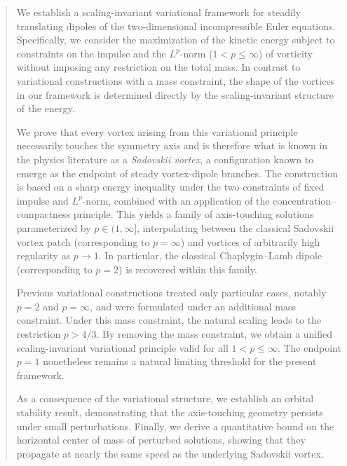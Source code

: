 \documentclass[10pt,a4paper]{amsart}
\theoremstyle{definition}
\theoremstyle{definition}
\numberwithin{equation}{section}
\newcommand{\0}{\emptyset}
\begin{document}
	\begin{abstract}  
    We establish a scaling-invariant variational framework for steadily translating dipoles of the two-dimensional incompressible Euler equations. Specifically, we consider the maximization of the kinetic energy subject to constraints on the impulse and the $L^p$-norm ($1<p\leq \infty$) of vorticity without imposing any restriction on the total mass. In contrast to variational constructions with a mass constraint, the shape of the vortices in our framework is determined directly by the scaling-invariant structure of the energy.

    We prove that every vortex arising from this variational principle necessarily touches the symmetry axis and is therefore what is known in the physics literature as a \emph{Sadovskii vortex}, a configuration known to emerge as the endpoint of steady vortex-dipole branches. The construction is based on a sharp energy inequality under the two constraints of fixed impulse and $L^p$-norm, combined with an application of the concentration--compactness principle. This yields a family of axis-touching solutions parameterized by $p \in (1,\infty]$, interpolating between the classical Sadovskii vortex patch (corresponding to $p=\infty$) and vortices of arbitrarily high regularity as $p \to 1$. In particular, the classical Chaplygin--Lamb dipole (corresponding to $p=2$) is recovered within this family.

    Previous variational constructions treated only particular cases, notably $p=2$ and $p=\infty$, and were formulated under an additional mass constraint. Under this mass constraint, the natural scaling leads to the restriction $p>4/3$. By removing the mass constraint, we obtain a unified scaling-invariant variational principle valid for all $1<p\le\infty$. The endpoint $p=1$ nonetheless remains a natural limiting threshold for the present framework.

    As a consequence of the variational structure, we establish {an orbital} stability result, demonstrating that the axis-touching geometry persists under small perturbations. Finally, we derive a quantitative bound on the horizontal center of mass of perturbed solutions, showing that they propagate at nearly the same speed as the underlying Sadovskii vortex.
	\end{abstract}
\end{document}
